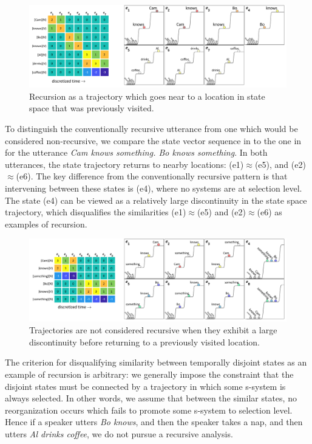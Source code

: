   
\begin{figure}
\includegraphics[width=\textwidth]{figures/Tilsen-img112.png}
\caption{Recursion as a trajectory which goes near to a location in state space that was previously visited.}
\label{fig:5:8}
\end{figure}
 

  To distinguish the conventionally recursive utterance from one which would be considered non-recursive, we compare the state vector sequence in {} to the one in {} for the utterance \textit{Cam knows something. Bo knows something}. In both utterances, the state trajectory returns to nearby locations: (e1)${\approx}$(e5), and (e2)${\approx}$(e6). The key difference from the conventionally recursive pattern is that intervening between these states is (e4), where no systems are at selection level. The state (e4) can be viewed as a relatively large discontinuity in the state space trajectory, which disqualifies the similarities (e1)${\approx}$(e5) and (e2)${\approx}$(e6) as examples of recursion.

  
\begin{figure}
\includegraphics[width=\textwidth]{figures/Tilsen-img113.png}
\caption{Trajectories are not considered recursive when they exhibit a large discontinuity before returning to a previously visited location.}
\label{fig:5:9}
\end{figure}
 

  The criterion for disqualifying similarity between temporally disjoint states as an example of recursion is arbitrary: we generally impose the constraint that the disjoint states must be connected by a trajectory in which some s-system is always selected. In other words, we assume that between the similar states, no reorganization occurs which fails to promote some s-system to selection level. Hence if a speaker utters \textit{Bo knows}, and then the speaker takes a nap, and then utters \textit{Al drinks coffee}, we do not pursue a recursive analysis. 

